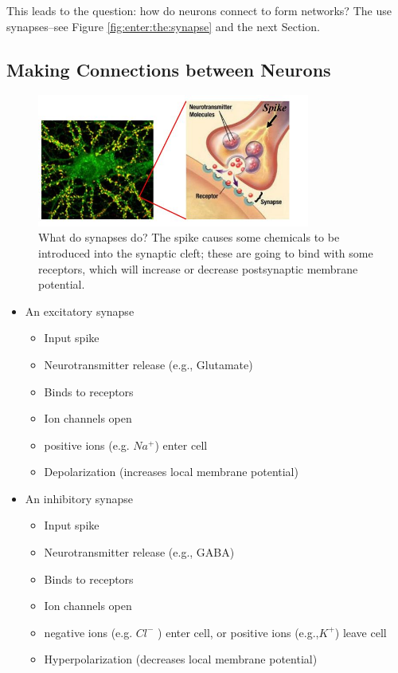 \documentclass[]{article}
\begin{document}
This leads to the question: how do neurons connect to form networks? The use synapses--see Figure \ref{fig:enter:the:synapse} and the next Section.

\subsection{Making Connections between Neurons}

\begin{figure}[H]
	\caption[What do synapses do?]{What do synapses do? The spike causes some chemicals to be introduced into the synaptic cleft; these are going to bind with some receptors, which will increase or decrease postsynaptic membrane potential.}
	\includegraphics[width=0.8\textwidth]{what-do-synspses-do}
\end{figure}

\begin{itemize}
	\item An excitatory synapse
	\begin{itemize}
		\item Input spike 
		\item Neurotransmitter release 	(e.g., Glutamate) 
		\item Binds to receptors
		\item Ion channels open
		\item positive ions (e.g. $Na^+$) enter cell
		\item Depolarization (increases local membrane potential)
	\end{itemize}
	\item An inhibitory synapse
	\begin{itemize}
		\item Input spike
		\item Neurotransmitter 	release (e.g., GABA)
		\item  Binds to receptors
		\item  Ion channels open
		\item  negative ions (e.g. $Cl^-$ ) enter cell, or positive ions (e.g.,$K^+$) leave cell 
		\item 	Hyperpolarization 	(decreases local membrane potential)
	\end{itemize}
\end{itemize}
\end{document}

